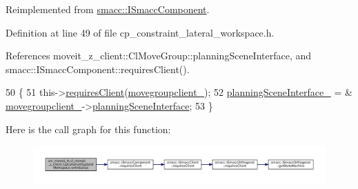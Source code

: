 Reimplemented from \hyperlink{classsmacc_1_1ISmaccComponent_ae6f71d008db12553912e9436184b9e65}{smacc\+::\+I\+Smacc\+Component}.



Definition at line 49 of file cp\+\_\+constraint\+\_\+lateral\+\_\+workspace.\+h.



References moveit\+\_\+z\+\_\+client\+::\+Cl\+Move\+Group\+::planning\+Scene\+Interface, and smacc\+::\+I\+Smacc\+Component\+::requires\+Client().


\begin{DoxyCode}
50             \{
51                 this->\hyperlink{classsmacc_1_1ISmaccComponent_a36c085d906fbae0fcaee817aaeafebf4}{requiresClient}(\hyperlink{classsm__moveit__4_1_1cl__moveit__z__client_1_1CpConstraintLateralWorkspace_aa68ed53b682a07e3dcf2ef4f11710b73}{movegroupclient\_});
52                 \hyperlink{classsm__moveit__4_1_1cl__moveit__z__client_1_1CpConstraintLateralWorkspace_a39ac03e23023aef4e90f6bdd2ea41f75}{planningSceneInterface\_} = &
      \hyperlink{classsm__moveit__4_1_1cl__moveit__z__client_1_1CpConstraintLateralWorkspace_aa68ed53b682a07e3dcf2ef4f11710b73}{movegroupclient\_}->\hyperlink{classmoveit__z__client_1_1ClMoveGroup_a21c879b2683286aa21ce68f40195b4b5}{planningSceneInterface};
53             \}
\end{DoxyCode}
Here is the call graph for this function\+:
\nopagebreak
\begin{figure}[H]
\begin{center}
\leavevmode
\includegraphics[width=350pt]{classsm__moveit__4_1_1cl__moveit__z__client_1_1CpConstraintLateralWorkspace_af50ccf402ab65fe3702188e5bdbcfdad_cgraph}
\end{center}
\end{figure}
\mbox{\label{classsm__moveit__4_1_1cl__moveit__z__client_1_1CpConstraintLateralWorkspace_a83138028b5fab59b84b9170c5df24a54}} 
